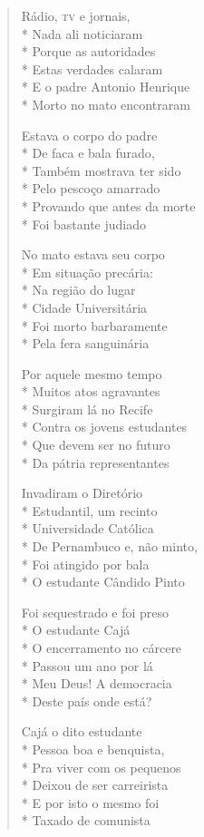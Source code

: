 \begin{verse}
Rádio, \textsc{tv} e jornais,\\*
Nada ali noticiaram\\*
Porque as autoridades\\*
Estas verdades calaram\\*
E o padre Antonio Henrique\\*
Morto no mato encontraram

Estava o corpo do padre\\*
De faca e bala furado,\\*
Também mostrava ter sido\\*
Pelo pescoço amarrado\\*
Provando que antes da morte\\*
Foi bastante judiado

No mato estava seu corpo\\*
Em situação precária:\\*
Na região do lugar\\*
Cidade Universitária\\*
Foi morto barbaramente\\*
Pela fera sanguinária

Por aquele mesmo tempo\\*
Muitos atos agravantes\\*
Surgiram lá no Recife\\*
Contra os jovens estudantes\\*
Que devem ser no futuro\\*
Da pátria representantes

Invadiram o Diretório\\*
Estudantil, um recinto\\*
Universidade Católica\\*
De Pernambuco e, não minto,\\*
Foi atingido por bala\\*
O estudante Cândido Pinto

Foi sequestrado e foi preso\\*
O estudante Cajá\\*
O encerramento no cárcere\\*
Passou um ano por lá\\*
Meu Deus! A democracia\\*
Deste país onde está?

Cajá o dito estudante\\*
Pessoa boa e benquista,\\*
Pra viver com os pequenos\\*
Deixou de ser carreirista\\*
E por isto o mesmo foi\\*
Taxado de comunista


\end{verse}
